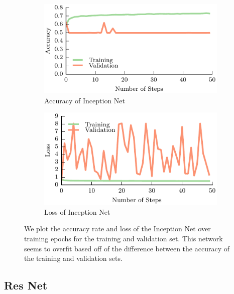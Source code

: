 \begin{figure}[t!]
    \centering
    \begin{subfigure}[t]{0.49\textwidth}
        \includegraphics[width=0.9\columnwidth]{figs/inception_accuracy.pdf}
        \caption{Accuracy of Inception Net} \label{fig:accuracy}
        \end{subfigure}
    \begin{subfigure}[t]{0.49\textwidth}
        \includegraphics[width=0.9\columnwidth]{figs/inception_loss.pdf}
        \caption{Loss of Inception Net} \label{fig:loss_inception}
    \end{subfigure}
\caption{We plot the accuracy rate and loss of the Inception Net over training epochs for the training and validation set. This network seems to overfit based off of the difference between the accuracy of the training and validation sets.} \label{fig:inceptionnet_results}
\end{figure}


\subsection{Res Net}


